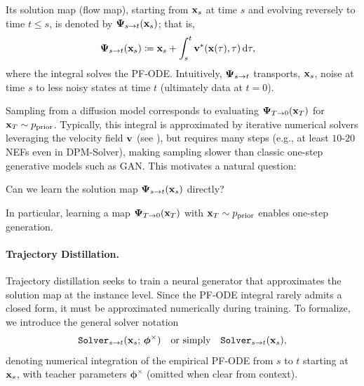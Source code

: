 Its solution map (flow map), starting from ${\mathbf{x}}_s$ at time $s$ and evolving reversely to time $t \leq s$, is denoted by ${\bm{\Psi}}_{s\to t}({\mathbf{x}}_s)$; that is,
\begin{align}\label{eq:int_target_gt}
\begin{aligned}
    {\bm{\Psi}}_{s\to t}({\mathbf{x}}_s) 
    &\coloneqq {\mathbf{x}}_s + \int_s^t {\mathbf{v}}^*({\mathbf{x}}(\tau), \tau) \mathop{}\!\mathrm{d} \tau,
\end{aligned}
\end{align}
where the integral solves the PF-ODE. Intuitively, ${\bm{\Psi}}_{s\to t}$ transports, ${\mathbf{x}}_s$, noise at time $s$ to less noisy states at time $t$ (ultimately data at $t=0$).


Sampling from a diffusion model corresponds to evaluating ${\bm{\Psi}}_{T\to 0}({\mathbf{x}}_T)$ for ${\mathbf{x}}_T \sim p_{\mathrm{prior}}$. Typically, this integral is approximated by iterative numerical solvers leveraging the velocity field ${\mathbf{v}}$ (see ), but requires many steps (e.g., at least $10$-$20$ NEFs even in DPM-Solver), making sampling slower than classic one-step generative models such as GAN. This motivates a natural question:
\begin{question}
    Can we learn the solution map ${\bm{\Psi}}_{s\to t}({\mathbf{x}}_s)$ directly? 
\end{question}
In particular, learning a map ${\bm{\Psi}}_{T\to 0}({\mathbf{x}}_T)$ with ${\mathbf{x}}_T \sim p_{\mathrm{prior}}$ enables one-step generation.


\paragraph{Trajectory Distillation.}

Trajectory distillation seeks to train a neural generator that approximates the solution map at the instance level. Since the PF-ODE integral rarely admits a closed form, it must be approximated numerically during training. To formalize, we introduce the general solver notation
\begin{align}\label{eq:solver}
    \mathtt{Solver}_{s\to t}({\mathbf{x}}_s;\,\bm{\phi}^\times)
    \quad \text{or simply} \quad
    \mathtt{Solver}_{s\to t}({\mathbf{x}}_s),
\end{align}
denoting numerical integration of the empirical PF-ODE from $s$ to $t$ starting
at ${\mathbf{x}}_s$, with teacher parameters $\bm{\phi}^\times$ (omitted when clear from
context). 



